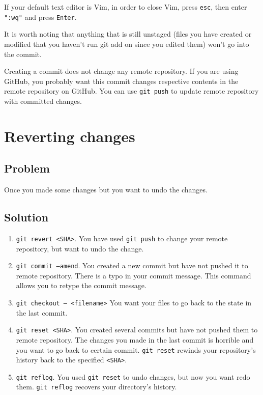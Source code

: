 \documentclass[12pt]{report}
\newcommand\code[1]{{\color{blue}\texttt{#1}}}
\begin{document}
If your default text editor is Vim, in order to close Vim, press \code{esc}, then enter \code{":wq"} and press \code{Enter}.

It is worth noting that anything that is still unstaged (files you have created or modified that you haven’t run git add on since you edited them) won’t go into the commit. 

Creating a commit does not change any remote repository. If you are using GitHub, you probably want this commit changes respective contents in the remote repository on GitHub. You can use \code{git push} to update remote repository with committed changes.


\section{Reverting changes}

\subsection*{Problem}

Once you made some changes but you want to undo the changes.

\subsection*{Solution}

\begin{enumerate}
  \item \code{git revert <SHA>}. You have used \code{git push} to change your remote repository, but want to undo the change.
  \item \code{git commit --amend}. You created a new commit but have not pushed it to remote repository. There is a typo in your commit message. This command allows you to retype the commit message.
  \item \code{git checkout -- <filename>} You want your files to go back to the state in the last commit.
  \item \code{git reset <SHA>}. You created several commits but have not pushed them to remote repository. The changes you made in the last commit is horrible and you want to go back to certain commit. \code{git reset} rewinds your repository's history back to the specified \code{<SHA>}.
  \item \code{git reflog}. You used \code{git reset} to undo changes, but now you want redo them. \code{git reflog} recovers your directory's history.
\end{enumerate}
\end{document}
